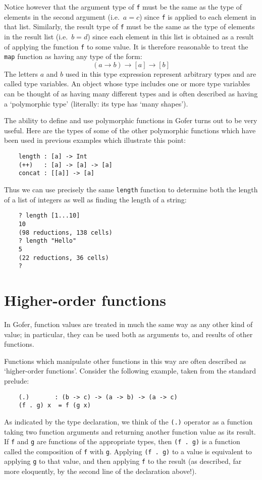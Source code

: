 Notice however that the argument type of \verb"f" must be the  same  as  the
type of elements in the second argument (i.e.\  $a=c$)  since  \verb"f"  is
applied to each element in that list.  Similarly, the  result  type  of
\verb"f" must be the same as the type of elements in the result list (i.e.\ $b
= d$) since each element in  this  list  is  obtained  as  a  result  of
applying the function \verb"f" to some value.  It is therefore reasonable to
treat the \verb"map" function as having any type of the form:
\[
                  (a \to b)  \to  [a]  \to  [b]
\]
The letters  $a$  and  $b$  used  in  this  type  expression  represent
arbitrary types and are called type variables.  An  object  whose  type
includes one or more type variables can be thought of  as  having  many
different types and is often described as having a  `polymorphic  type'
(literally: its type has `many shapes').

The ability to define and use polymorphic functions in Gofer turns  out
to be very useful.  Here are the types of some of the other polymorphic
functions which have been used in previous  examples  which  illustrate
this point:
\begin{verbatim}
    length : [a] -> Int
    (++)   : [a] -> [a] -> [a]
    concat : [[a]] -> [a]
\end{verbatim}
Thus we can use precisely the same \verb"length" function to determine  both
the length of a list of integers as well as finding  the  length  of  a
string:
\begin{verbatim}
    ? length [1...10]
    10
    (98 reductions, 138 cells)
    ? length "Hello"
    5
    (22 reductions, 36 cells)
    ? 
\end{verbatim}

\section{Higher-order functions}
In Gofer, function values are treated in much the same way as any other
kind of value; in particular, they can be used both  as  arguments  to,
and results of other functions.

Functions which manipulate  other  functions  in  this  way  are  often
described as `higher-order functions'.  Consider the following example,
taken from the standard prelude:
\begin{verbatim}
    (.)       : (b -> c) -> (a -> b) -> (a -> c)
    (f . g) x  = f (g x)
\end{verbatim}
As indicated by the type declaration, we think of the \verb"(.)" operator as a
function taking two function arguments and returning  another  function
value as its result.  If \verb"f" and  \verb"g"
are  functions  of  the  appropriate
types, then \verb"(f . g)" 
is a function called the composition of \verb"f"  with  \verb"g".
Applying \verb"(f . g)" to a value is equivalent to applying \verb"g"
to that  value,
and then applying \verb"f" to the result (as described, far  more  eloquently,
by the second line of the declaration above!).

